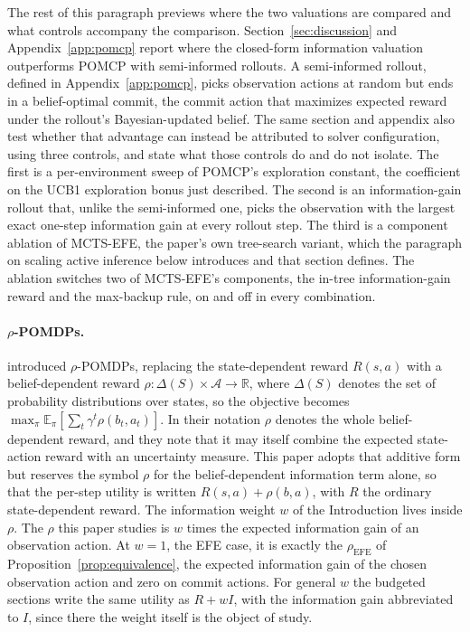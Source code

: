 The rest of this paragraph previews where the two valuations are compared and what controls accompany the comparison. Section~\ref{sec:discussion} and Appendix~\ref{app:pomcp} report where the closed-form information valuation outperforms POMCP with semi-informed rollouts. A semi-informed rollout, defined in Appendix~\ref{app:pomcp}, picks observation actions at random but ends in a belief-optimal commit, the commit action that maximizes expected reward under the rollout's Bayesian-updated belief. The same section and appendix also test whether that advantage can instead be attributed to solver configuration, using three controls, and state what those controls do and do not isolate. The first is a per-environment sweep of POMCP's exploration constant, the coefficient on the UCB1 exploration bonus just described. The second is an information-gain rollout that, unlike the semi-informed one, picks the observation with the largest exact one-step information gain at every rollout step. The third is a component ablation of MCTS-EFE, the paper's own tree-search variant, which the paragraph on scaling active inference below introduces and that section defines. The ablation switches two of MCTS-EFE's components, the in-tree information-gain reward and the max-backup rule, on and off in every combination.

\paragraph{$\rho$-POMDPs.}
\citet{araya2010} introduced $\rho$-POMDPs, replacing the state-dependent reward $R(s,a)$ with a belief-dependent reward $\rho : \Delta(S) \times \mathcal{A} \to \mathbb{R}$, where $\Delta(S)$ denotes the set of probability distributions over states, so the objective becomes $\max_\pi \mathbb{E}_\pi[\sum_t \gamma^t \rho(b_t,a_t)]$. In their notation $\rho$ denotes the whole belief-dependent reward, and they note that it may itself combine the expected state-action reward with an uncertainty measure. This paper adopts that additive form but reserves the symbol $\rho$ for the belief-dependent information term alone, so that the per-step utility is written $R(s,a) + \rho(b,a)$, with $R$ the ordinary state-dependent reward. The information weight $w$ of the Introduction lives inside $\rho$. The $\rho$ this paper studies is $w$ times the expected information gain of an observation action. At $w{=}1$, the EFE case, it is exactly the $\rho_{\mathrm{EFE}}$ of Proposition~\ref{prop:equivalence}, the expected information gain of the chosen observation action and zero on commit actions. For general $w$ the budgeted sections write the same utility as $R + wI$, with the information gain abbreviated to $I$, since there the weight itself is the object of study.

